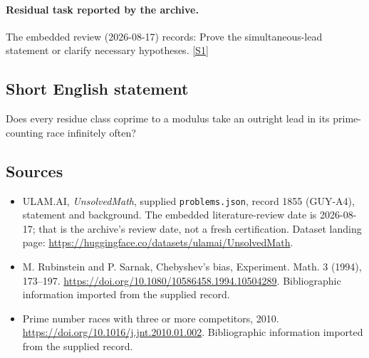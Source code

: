 \documentclass[11pt,a4paper]{article}
\newcommand{\sref}[2]{\hyperlink{source:#1:#2}{[S#2]}}
\begin{document}
\paragraph{Residual task reported by the archive.}

The embedded review (2026-08-17) records: Prove the simultaneous-lead statement or clarify necessary hypotheses. \sref{1855}{1}

\subsection{Short English statement}

Does every residue class coprime to a modulus take an outright lead in its prime-counting race infinitely often?

\subsection{Sources}

{\small

\begin{itemize}

\item[\hypertarget{source:1855:1}{S1}] ULAM.AI, \emph{UnsolvedMath}, supplied \texttt{problems.json}, record 1855 (GUY-A4), statement and background. The embedded literature-review date is 2026-08-17; that is the archive’s review date, not a fresh certification. Dataset landing page: \url{https://huggingface.co/datasets/ulamai/UnsolvedMath}.

\item[\hypertarget{source:1855:2}{S2}] M. Rubinstein and P. Sarnak, Chebyshev's bias, Experiment. Math. 3 (1994), 173--197. \url{https://doi.org/10.1080/10586458.1994.10504289}. Bibliographic information imported from the supplied record.

\item[\hypertarget{source:1855:3}{S3}] Prime number races with three or more competitors, 2010. \url{https://doi.org/10.1016/j.jnt.2010.01.002}. Bibliographic information imported from the supplied record.

\end{itemize}

}

\label{end:1855}
\end{document}
